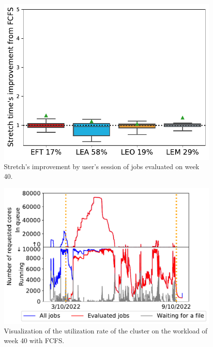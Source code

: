 \documentclass[sigconf,review,anonymous]{acmart}
\newcommand{\rev}[1]{{\color{blue}{#1}}}
\begin{document}
\subsection{\rev{Performance on an underutilized cluster}}\label{sec.40}

\begin{figure}[t]\centering\includegraphics[width=0.9\linewidth]{../MBSS/plot/Boxplot/byuser/box_plot_stretch_10-03-10-09_0.pdf}\caption{Stretch's improvement by user's session of jobs evaluated on week 40.}\label{stretch.40}\end{figure}
\begin{figure}[t]\centering\includegraphics[width=0.9\linewidth]{../MBSS/plot/Cluster_usage/2022-10-03->2022-10-09_V10000_anonymous_Fcfs_Used_nodes_450_128_32_256_4_1024_core_by_core.pdf}\caption{Visualization of the utilization rate of the cluster on the workload of week 40 with FCFS.}\label{40_cluster_usage_fcfs}\end{figure}
\end{document}
